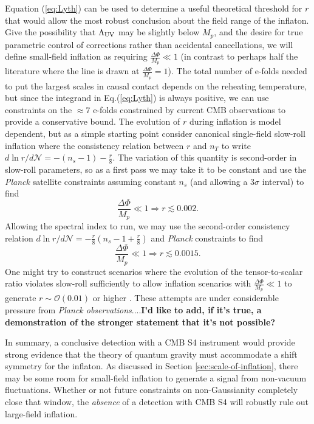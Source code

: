 Equation (\ref{eq:Lyth}) can be used to determine a useful theoretical threshold for $r$ that would allow the most robust conclusion about the field range of the inflaton. Give the possibility that $\Lambda_{\rm UV}$ may be slightly below $M_p$, and the desire for true parametric control of corrections rather than accidental cancellations, we will define small-field inflation as requiring $\frac{\Delta\Phi}{M_p}\ll1$ (in contrast to perhaps half the literature where the line is drawn at $\frac{\Delta\Phi}{M_p}=1$). The total number of e-folds needed to put the largest scales in causal contact depends on the reheating temperature, but since the integrand in Eq.(\ref{eq:Lyth}) is always positive, we can use constraints on the $\approx 7$ e-folds constrained by current CMB observations to provide a conservative bound. The evolution of $r$ during inflation is model dependent, but as a simple starting point consider canonical single-field slow-roll inflation where the consistency relation between $r$ and $n_T$ to write $d\ln r/d\mathcal{N}=-(n_s-1)-\frac{r}{8}$. The variation of this quantity is second-order in slow-roll parameters, so as a first pass we may take it to be constant and use the {\it Planck} satellite constraints assuming constant $n_s$ (and allowing a $3\sigma$ interval) to find
\begin{equation}
\frac{\Delta\Phi}{M_p}\ll1\Rightarrow r\lesssim0.002.
\end{equation}
Allowing the spectral index to run, we may use the second-order consistency relation $d\ln r/d\mathcal{N}=-\frac{r}{8}(n_s-1+\frac{r}{8})$ and {\it Planck} constraints to find 
\begin{equation}
\frac{\Delta\Phi}{M_p}\ll1\Rightarrow r\lesssim0.0015.
\end{equation}
One might try to construct scenarios where the evolution of the tensor-to-scalar ratio violates slow-roll sufficiently to allow inflation scenarios with $\frac{\Delta\Phi}{M_p}\ll1$ to generate $r\sim\mathcal{O}(0.01)$ or higher \cite{BenDayan:2009kvHotchkiss:2011gzm, Chatterjee:2014hna}. These attempts are under considerable pressure from {\it Planck observations}....{\bf I'd like to add, if it's true, a demonstration of the stronger statement that it's not possible?}

In summary, a conclusive detection with a CMB S4 instrument would provide strong evidence that the theory of quantum gravity must accommodate a shift symmetry for the inflaton. As discussed in Section \ref{sec:scale-of-inflation}, there may be some room for small-field inflation to generate a signal from non-vacuum fluctuations. Whether or not future constraints on non-Gaussianity completely close that window, the {\it absence} of a detection with CMB S4 will robustly rule out large-field inflation. 

